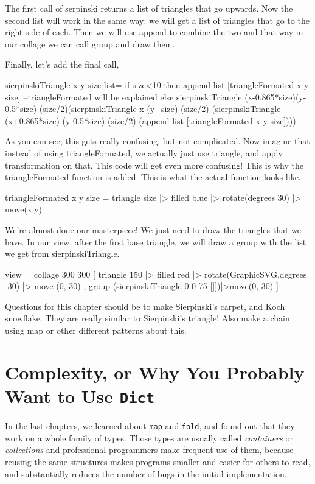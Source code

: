 \documentclass[12pt]{amsbook}
\begin{document}
The first call of serpinski returns a list of triangles that go upwards. Now the second list will work in the same way: we will get a list of triangles that go to the right side of each. Then we will use append to combine the two and that way in our collage we can call group and draw them. 

Finally, let's add the final call,
\begin{code}
	sierpinskiTriangle x y size list= 
		    if size<10 then
		    	append list [triangleFormated x y size] --triangleFormated will be explained
		    else
       			sierpinskiTriangle (x-0.865*size)(y-0.5*size) (size/2)(sierpinskiTriangle x (y+size) (size/2) (sierpinskiTriangle (x+0.865*size) (y-0.5*size) (size/2) (append list [triangleFormated x y size])))
\end{code}


As you can see, this gets really confusing, but not complicated. Now imagine that instead of using triangleFormated, we actually just use triangle, and apply transformation on that. This code will get even more confusing! This is why the triangleFormated function is added. This is what the actual function looks like.

\begin{code}
	triangleFormated x y size =
	    triangle size
	        |> filled blue
	        |> rotate(degrees 30)
	        |> move(x,y)
\end{code}

We're almost done our masterpiece! We just need to draw the triangles that we have. In our view, after the first base triangle, we will draw a group with the list we get from sierpinskiTriangle. 

\begin{code}
view = collage 300 300 [
                         triangle 150
	                            |> filled red
	                            |> rotate(GraphicSVG.degrees -30)
	                            |> move (0,-30)
                       , group (sierpinskiTriangle 0 0 75 []])|>move(0,-30)
                       ]
\end{code}
 
Questions for this chapter should be to make Sierpinski's carpet, and Koch snowflake.
		They are really similar to Sierpinski's triangle!
Also make a chain using map or other different patterns about this.

\chapter{Complexity, or Why You Probably Want to Use \texttt{Dict}}
%
In the last chapters, we learned about \texttt{map} and \texttt{fold},
and found out that they work on a whole family of types.
Those types are usually called \emph{containers} or \emph{collections} 
and professional programmers make frequent use of them,
because reusing the same structures makes programs smaller and easier for others to read, and substantially reduces the number of bugs in the initial implementation.
\end{document}
